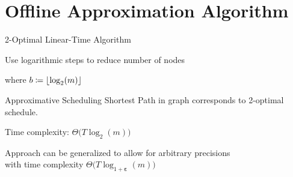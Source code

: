 \documentclass{beamer}
\DeclarePairedDelimiter\floor{\lfloor}{\rfloor}
\newcommand{\beps}{\boldsymbol\varepsilon}
\begin{document}
\section{Offline Approximation Algorithm}
\begin{frame}{2-Optimal Linear-Time Algorithm}
\centerline{Use logarithmic steps to reduce number of nodes}
\pause
\begin{figure}
	
\end{figure}
\centering where $b\coloneqq\floor{\log_2(m)}$
\end{frame}
\begin{frame}{Approximative Scheduling}
Shortest Path in graph corresponds to 2-optimal schedule.

\pause Time complexity: $\Theta\bigl(T\log_2(m)\bigr)$
\vspace{\baselineskip}
\pause\begin{alertbox} 
\centering Approach can be generalized to allow for arbitrary precisions\\with time complexity $\Theta\bigl(T\log_{1+\beps}(m)\bigr)$
\end{alertbox}
\end{frame}
\end{document}
